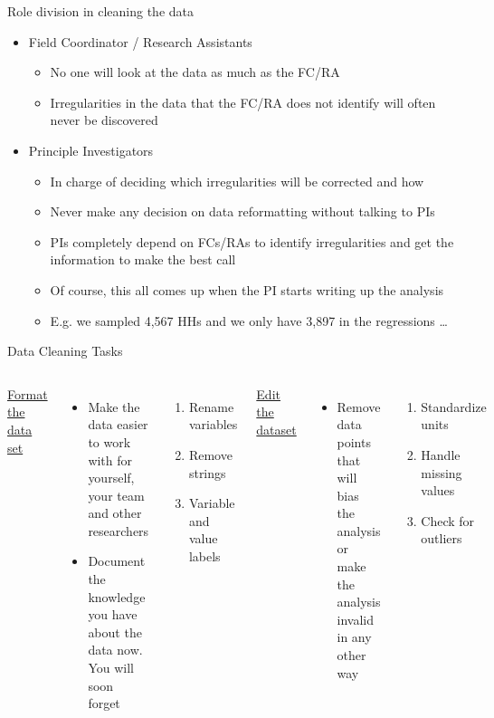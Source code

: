 \documentclass[aspectratio=169]{beamer}
\begin{document}
\begin{frame}{Role division in cleaning the data}
	\begin{itemize}
		\item Field Coordinator / Research Assistants
		\begin{itemize}
			\item No one will look at the data as much as the FC/RA
			\item Irregularities in the data that the FC/RA does not identify will often never be discovered
		\end{itemize}
		\item Principle Investigators
		\begin{itemize}
			\item In charge of deciding which irregularities will be corrected and how
			\item Never make any decision on data reformatting without talking to PIs
			\item PIs completely depend on FCs/RAs to identify irregularities and get the information to make the best call
			\item Of course, this all comes up when the PI starts writing up the analysis
			\item E.g. we sampled 4,567 HHs and we only have 3,897 in the regressions …
		\end{itemize}
	\end{itemize}
\end{frame}

\begin{frame}{Data Cleaning Tasks}
\color{red}{I added the text from the next slide in tex format. If this doesn't look as appealing please keep just the next slide.}

	\begin{columns}[c]
		\underline{	Format the data set}
		\begin{itemize}
			\item Make the data easier to work with for yourself, your team and other researchers
			\item Document the knowledge you have about the data now. You will soon forget
		\end{itemize}
		\begin{enumerate}
			\item Rename variables
			\item Remove strings
			\item Variable and value labels
		\end{enumerate}
	\underline{Edit the dataset}
		\begin{itemize}
			\item Remove data points that will bias the analysis or make the analysis invalid in any other way
		\end{itemize}
		\begin{enumerate}
			\item Standardize units
			\item Handle missing values
			\item Check for outliers
		\end{enumerate}	
	\end{columns}
\end{frame}
	
\end{document}
